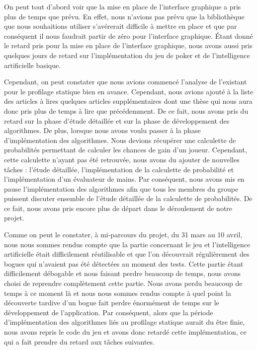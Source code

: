 \documentclass{report}
\begin{document}
On peut tout d'abord voir que la mise en place de l'interface graphique a pris plus de temps que prévu. En effet, nous n'avions pas prévu que la bibliothèque que nous souhaitions utiliser s’avérerait difficile à mettre en place et que par conséquent il nous faudrait partir de zéro pour l'interface graphique. Étant donné le retard pris pour la mise en place de l'interface graphique, nous avons aussi pris quelques jours de retard sur l'implémentation du jeu de poker et de l'intelligence artificielle basique. \par
Cependant, on peut constater que nous avions commencé l'analyse de l'existant pour le profilage statique bien en avance. Cependant, nous avions ajouté à la liste des articles à lires quelques articles supplémentaires dont une thèse qui nous aura donc pris plus de temps à lire que précédemment. De ce fait, nous avons pris du retard sur la phase d'étude détaillée et sur la phase de développement des algorithmes. De plus, lorsque nous avons voulu passer à la phase d'implémentation des algorithmes. Nous devions récupérer une calculette de probabilités permettant de calculer les chances de gain d'un joueur. Cependant, cette calculette n'ayant pas été retrouvée, nous avons du ajouter de nouvelles tâches : l'étude détaillée, l'implémentation de la calculette de probabilité et l'implémentation d'un évaluateur de mains. Par conséquent, nous avons mis en pause l'implémentation des algorithmes afin que tous les membres du groupe puissent discuter ensemble de l'étude détaillée de la calculette de probabilités. De ce fait, nous avons pris encore plus de départ dans le déroulement de notre projet. \par

Comme on peut le constater, à mi-parcours du projet, du 31 mars au 10 avril, nous nous sommes rendus compte que la partie concernant le jeu et l'intelligence artificielle était difficilement réutilisable et que l'on découvrait régulièrement des bogues qui n'avaient pas été détectées au moment des tests. Cette partie étant difficilement débogable et nous faisant perdre beaucoup de temps, nous avons choisi de reprendre complètement cette partie. Nous avons perdu beaucoup de temps à ce moment là et nous nous sommes rendus compte à quel point la découverte tardive d'un bogue fait perdre énormément de temps sur le développement de l'application. Par conséquent, alors que la période d'implémentation des algorithmes liés au profilage statique aurait du être finie, nous avons repris le code du jeu et avons donc retardé cette implémentation, ce qui a fait prendre du retard aux tâches suivantes.\par
\end{document}
